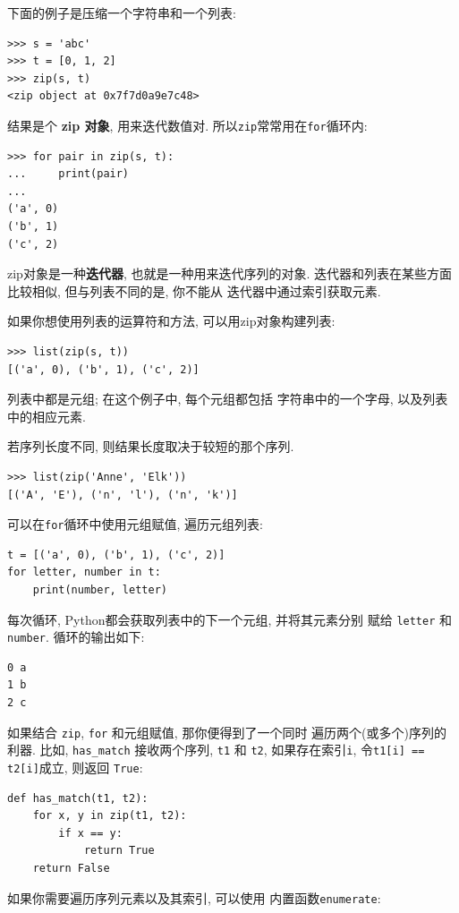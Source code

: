 \documentclass[10pt]{book}
\begin{document}
下面的例子是压缩一个字符串和一个列表:

\begin{verbatim}
>>> s = 'abc'
>>> t = [0, 1, 2]
>>> zip(s, t)
<zip object at 0x7f7d0a9e7c48>
\end{verbatim}
%
结果是个 {\bf zip 对象}, 用来迭代数值对. 
所以{\tt zip}常常用在{\tt for}循环内:

\begin{verbatim}
>>> for pair in zip(s, t):
...     print(pair)
...
('a', 0)
('b', 1)
('c', 2)
\end{verbatim}
%

zip对象是一种{\bf 迭代器}, 也就是一种用来迭代序列的对象. 
迭代器和列表在某些方面比较相似, 但与列表不同的是, 你不能从
迭代器中通过索引获取元素. 

如果你想使用列表的运算符和方法, 可以用zip对象构建列表:

\begin{verbatim}
>>> list(zip(s, t))
[('a', 0), ('b', 1), ('c', 2)]
\end{verbatim}
%
列表中都是元组; 在这个例子中, 每个元组都包括
字符串中的一个字母, 以及列表中的相应元素. 

若序列长度不同, 则结果长度取决于较短的那个序列. 

\begin{verbatim}
>>> list(zip('Anne', 'Elk'))
[('A', 'E'), ('n', 'l'), ('n', 'k')]
\end{verbatim}
%
可以在{\tt for}循环中使用元组赋值, 遍历元组列表:

\begin{verbatim}
t = [('a', 0), ('b', 1), ('c', 2)]
for letter, number in t:
    print(number, letter)
\end{verbatim}
%
每次循环, Python都会获取列表中的下一个元组, 并将其元素分别
赋给 {\tt letter} 和 {\tt number}. 
循环的输出如下:

\begin{verbatim}
0 a
1 b
2 c
\end{verbatim}
%
如果结合 {\tt zip}, {\tt for} 和元组赋值, 那你便得到了一个同时
遍历两个(或多个)序列的利器. 比如, \verb"has_match" 接收两个序列, 
{\tt t1} 和 {\tt t2}, 如果存在索引{\tt i}, 令{\tt t1[i] == t2[i]}成立, 
则返回 {\tt True}:

\begin{verbatim}
def has_match(t1, t2):
    for x, y in zip(t1, t2):
        if x == y:
            return True
    return False
\end{verbatim}
%
如果你需要遍历序列元素以及其索引, 可以使用
内置函数{\tt enumerate}:
\end{document}
